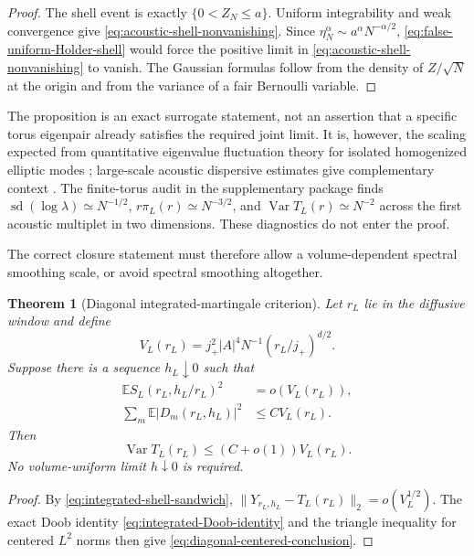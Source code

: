 \documentclass[11pt]{article}
\newtheorem{theorem}{Theorem}[section]
\theoremstyle{definition}
\theoremstyle{remark}
\newcommand{\E}{\mathbb E}
\newcommand{\Var}{\operatorname{Var}}
\newcommand{\abs}[1]{\left\lvert #1\right\rvert}
\begin{document}
\begin{proof}
The shell event is exactly $\{0<Z_N\le a\}$.  Uniform integrability and weak
convergence give \eqref{eq:acoustic-shell-nonvanishing}.  Since
$\eta_N^\alpha\sim a^\alpha N^{-\alpha/2}$,
\eqref{eq:false-uniform-Holder-shell} would force the positive limit in
\eqref{eq:acoustic-shell-nonvanishing} to vanish.  The Gaussian formulas
follow from the density of $Z/\sqrt N$ at the origin and from the variance of
a fair Bernoulli variable.
\end{proof}

The proposition is an exact surrogate statement, not an assertion that a
specific torus eigenpair already satisfies the required joint limit.  It is,
however, the scaling expected from quantitative eigenvalue fluctuation theory
for isolated homogenized elliptic modes \cite{Duerinckx2022Eigenvalue}; large-scale acoustic dispersive estimates give complementary context \cite{DuerinckxGloria2025}.  The
finite-torus audit in the supplementary package finds
$\operatorname{sd}(\log\lambda)\simeq N^{-1/2}$,
$r\pi_L(r)\simeq N^{-3/2}$, and
$\Var T_L(r)\simeq N^{-2}$ across the first acoustic multiplet in two
dimensions.  These diagnostics do not enter the proof.

The correct closure statement must therefore allow a volume-dependent
spectral smoothing scale, or avoid spectral smoothing altogether.

\begin{theorem}[Diagonal integrated-martingale criterion]
\label{thm:diagonal-integrated-martingale-criterion}
Let $r_L$ lie in the diffusive window and define
\begin{equation}
 V_L(r_L)=j_+^2\abs A^4N^{-1}(r_L/j_+)^{d/2}.
 \label{eq:target-centered-variance-scale}
\end{equation}
Suppose there is a sequence $h_L\downarrow0$ such that
\begin{align}
 \E S_L(r_L,h_L/r_L)^2&=o(V_L(r_L)),
 \label{eq:diagonal-shell-error}\\
 \sum_m\E\abs{D_m(r_L,h_L)}^2&\le C V_L(r_L).
 \label{eq:diagonal-integrated-QV}
\end{align}
Then
\begin{equation}
 \Var T_L(r_L)\le(C+o(1))V_L(r_L).
 \label{eq:diagonal-centered-conclusion}
\end{equation}
No volume-uniform limit $h\downarrow0$ is required.
\end{theorem}

\begin{proof}
By \eqref{eq:integrated-shell-sandwich},
$\|Y_{r_L,h_L}-T_L(r_L)\|_2=o(V_L^{1/2})$.
The exact Doob identity \eqref{eq:integrated-Doob-identity} and the triangle
inequality for centered $L^2$ norms then give
\eqref{eq:diagonal-centered-conclusion}.
\end{proof}
\end{document}
